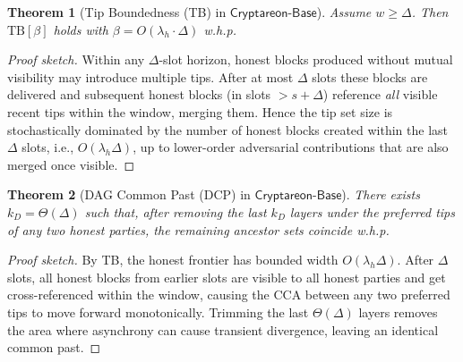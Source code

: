 \documentclass[11pt]{article}
\newtheorem{theorem}{Theorem}[section]
\newcommand{\ProjBase}{\ensuremath{\mathsf{Cryptareon\text{-}Base}}\xspace}
\begin{document}
\begin{theorem}[Tip Boundedness (TB) in \ProjBase]
\label{thm:base-TB}
Assume $w\ge \Delta$. Then $\mathrm{TB}[\beta]$ holds with $\beta=O(\lambda_h\cdot \Delta)$ w.h.p.
\end{theorem}
\begin{proof}[Proof sketch]
Within any $\Delta$-slot horizon, honest blocks produced without mutual visibility may introduce multiple tips. After at most $\Delta$ slots these blocks are delivered and subsequent honest blocks (in slots $>s{+}\Delta$) reference \emph{all} visible recent tips within the window, merging them. Hence the tip set size is stochastically dominated by the number of honest blocks created within the last $\Delta$ slots, i.e., $O(\lambda_h\Delta)$, up to lower-order adversarial contributions that are also merged once visible.
\end{proof}

\begin{theorem}[DAG Common Past (DCP) in \ProjBase]
\label{thm:base-DCP}
There exists $k_D=\Theta(\Delta)$ such that, after removing the last $k_D$ layers under the preferred tips of any two honest parties, the remaining ancestor sets coincide w.h.p.
\end{theorem}
\begin{proof}[Proof sketch]
By TB, the honest frontier has bounded width $O(\lambda_h\Delta)$. After $\Delta$ slots, all honest blocks from earlier slots are visible to all honest parties and get cross-referenced within the window, causing the CCA between any two preferred tips to move forward monotonically. Trimming the last $\Theta(\Delta)$ layers removes the area where asynchrony can cause transient divergence, leaving an identical common past.
\end{proof}
\end{document}
